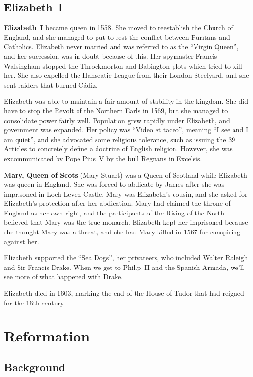 \subsection*{Elizabeth~I}

\textbf{Elizabeth~I} became queen in 1558.
She moved to reestablish the Church of England,
and she managed to put to rest the conflict between Puritans and Catholics.
Elizabeth never married and was referred to as the ``Virgin Queen'',
and her succession was in doubt because of this.
Her spymaster Francis Walsingham stopped the Throckmorton and Babington plots which tried to kill her.
She also expelled the Hanseatic League from their London Steelyard,
and she sent raiders that burned C\'a{}diz.

Elizabeth was able to maintain a fair amount of stability in the kingdom.
She did have to stop the Revolt of the Northern Earls in 1569,
but she managed to consolidate power fairly well.
Population grew rapidly under Elizabeth, and government was expanded.
Her policy was ``Video et taceo'', meaning ``I see and I am quiet'',
and she advocated some religious tolerance,
such as issuing the 39 Articles to concretely define a doctrine of English religion.
However, she was excommunicated by Pope Pius~V by the bull Regnans in Excelsis.

\textbf{Mary, Queen of Scots} (Mary Stuart) was a Queen of Scotland while Elizabeth was queen in England.
She was forced to abdicate by James after she was imprisoned in Loch Leven Castle.
Mary was Elizabeth's cousin, and she asked for Elizabeth's protection after her abdication.
Mary had claimed the throne of England as her own right,
and the participants of the Rising of the North believed that Mary was the true monarch.
Elizabeth kept her imprisoned because she thought Mary was a threat,
and she had Mary killed in 1567 for conspiring against her.

Elizabeth supported the ``Sea Dogs'', her privateers,
who included Walter Raleigh and Sir Francis Drake.
When we get to Philip~II and the Spanish Armada, we'll see more of what happened with Drake.

Elizabeth died in 1603, marking the end of the House of Tudor that had reigned for the 16th century.

\section{Reformation}

\subsection*{Background}

